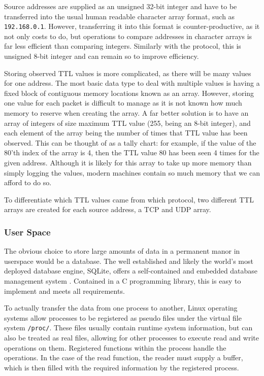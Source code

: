 \documentclass[twocolumn,10pt]{asme2ej}
\begin{document}
Source addresses are supplied as an unsigned 32-bit integer and have to be transferred into the usual human readable character array format, such as \texttt{192.168.0.1}. However, transferring it into this format is counter-productive, as it not only costs to do, but operations to compare addresses in character arrays is far less efficient than comparing integers. Similarly with the protocol, this is unsigned 8-bit integer and can remain so to improve efficiency.

Storing observed TTL values is more complicated, as there will be many values for one address. The most basic data type to deal with multiple values is having a fixed block of contiguous memory locations known as an array. However, storing one value for each packet is difficult to manage as it is not known how much memory to reserve when creating the array. A far better solution is to have an array of integers of size maximum TTL value (255, being an 8-bit integer), and each element of the array being the number of times that TTL value has been observed. This can be thought of as a tally chart: for example, if the value of the 80'th index of the array is 4, then the TTL value 80 has been seen 4 times for the given address. Although it is likely for this array to take up more memory than simply logging the values, modern machines contain so much memory that we can afford to do so.

To differentiate which TTL values came from which protocol, two different TTL arrays are created for each source address, a TCP and UDP array.

\subsubsection{User Space}
The obvious choice to store large amounts of data in a permanent manor in userspace would be a database. The well established and likely the world's most deployed database engine, SQLite, offers a self-contained and embedded database management system \cite{sqlite}. Contained in a C programming library, this is easy to implement and meets all requirements.

To actually transfer the data from one process to another, Linux operating systems allow processes to be registered as pseudo files under the virtual file system \texttt{/proc/}\cite{proc}. These files usually contain runtime system information, but can also be treated as real files, allowing for other processes to execute read and write operations on them. Registered functions within the process handle the operations. In the case of the read function, the reader must supply a buffer, which is then filled with the required information by the registered process.
\end{document}
